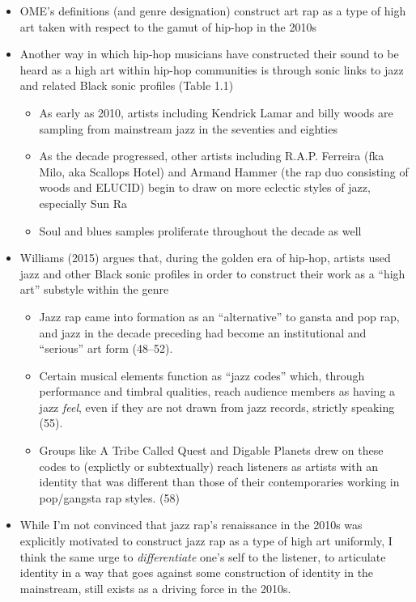     \begin{itemize}
        \item OME's definitions (and genre designation) construct art rap as a type of high art taken with 
        respect to the gamut of hip-hop in the 2010s
        \item Another way in which hip-hop musicians have constructed their sound to be heard as a high art
        within  hip-hop communities is through sonic links to jazz and related Black sonic profiles (Table 1.1)
            \begin{itemize}
                \item As early as 2010, artists including Kendrick Lamar and billy woods are sampling 
                from  mainstream jazz in the seventies and eighties
                \item As the decade progressed, other artists including R.A.P. Ferreira (fka Milo, aka 
                Scallops Hotel)  and Armand Hammer (the rap duo consisting of woods and ELUCID) begin to 
                draw on more eclectic styles of jazz, especially Sun Ra
                \item Soul and blues samples proliferate throughout the decade as well
            \end{itemize}
        \item Williams (2015) argues that, during the golden era of hip-hop, artists used jazz and other 
        Black sonic profiles in order to construct their work as a ``high art'' substyle within the genre
            \begin{itemize}
                \item Jazz rap came into formation as an ``alternative'' to gansta and pop rap, and jazz in 
                the decade  preceding had become an institutional and ``serious'' art form (48--52).
                \item Certain musical elements function as ``jazz codes'' which, through performance and 
                timbral qualities, reach audience members as having a jazz \emph{feel}, even if they are 
                not drawn from jazz records, strictly speaking (55).
                \item Groups like A Tribe Called Quest and Digable Planets drew on these codes to (explictly 
                or subtextually) reach listeners as artists with an identity that was different than those of 
                their contemporaries working in pop/gangsta rap styles. (58)
            \end{itemize}        
        \item While I'm not convinced that jazz rap's renaissance in the 2010s was explicitly motivated to construct 
        jazz rap as a type of high art uniformly, I think the same urge to \emph{differentiate} one's self to the 
        listener, to articulate identity in a way that goes against some construction of identity in the mainstream, 
        still exists as a driving force in the 2010s.
    \end{itemize}
    
